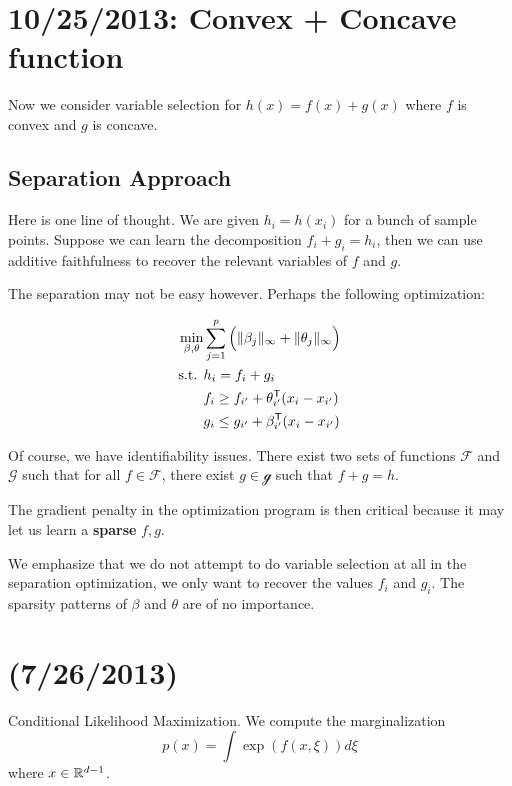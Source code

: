 \documentclass{article}
\begin{document}
\

\section{10/25/2013: Convex + Concave function}

Now we consider variable selection for $h(x) = f(x) + g(x)$ where $f$ is convex and $g$ is concave.

\subsection{Separation Approach}

Here is one line of thought. We are given $h_i = h(x_i)$ for a bunch of sample points. Suppose we can learn the decomposition $f_i + g_i = h_i$, then we can use additive faithfulness to recover the relevant variables of $f$ and $g$.

The separation may not be easy however. Perhaps the following optimization:

\begin{align*}
\min_{\beta, \theta}&\sum_{j=1}^p \Big( \|\beta_j\|_\infty + \| \theta_j\|_\infty \Big) \\
 \textrm{s.t. } & h_i = f_i + g_i \\
 & f_i \geq f_{i'} + \theta_{i'}^{\mathsf{T}} (x_i - x_{i'}) \\
 & g_i \leq g_{i'} + \beta_{i'}^{\mathsf{T}} (x_i - x_{i'}) 
\end{align*}

Of course, we have identifiability issues. There exist two sets of functions $\mathcal{F}$ and $\mathcal{G}$ such that for all $f \in \mathcal{F}$, there exist $g \in \mathcal{g}$ such that $f+g = h$. 

The gradient penalty in the optimization program is then critical because it may let us learn a \textbf{sparse} $f,g$. 

We emphasize that we do not attempt to do variable selection at all in the separation optimization, we only want to recover the values $f_i$ and $g_i$. The sparsity patterns of $\beta$ and $\theta$ are of no importance.


\newpage

\section{(7/26/2013)}

Conditional Likelihood Maximization. We compute the marginalization
$$
p(x) = \int \exp(f(x, \xi)) d \xi
$$
where $x \in \mathbb{R}^{d-1}$.
\end{document}
